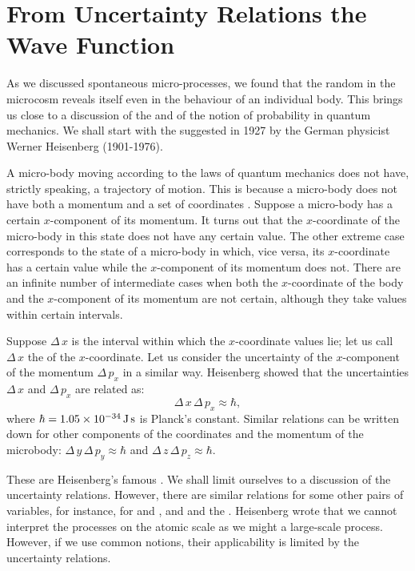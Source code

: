 \section{From Uncertainty Relations the Wave Function}

As we discussed spontaneous micro-processes, we found that the random
in the microcosm reveals itself even in the behaviour of an individual
body. This brings us close to a discussion of the  and
 of the notion of probability in quantum mechanics. We shall start with the  suggested in 1927 by the German physicist Werner Heisenberg (1901-1976).

 A micro-body moving according to the laws of quantum mechanics does not have, strictly speaking, a trajectory of
motion. This is because a micro-body does not have both a momentum
and a set of coordinates . Suppose a micro-body has
a certain $x$-component of its momentum. It turns out that the
$x$-coordinate of the micro-body in this state does not have any certain
value. The other extreme case corresponds to the state of a micro-body
in which, vice versa, its $x$-coordinate has a certain value while the
$x$-component of its momentum does not. There are an infinite number
of intermediate cases when both the $x$-coordinate of the body and the
$x$-component of its momentum are not certain, although they take
values within certain intervals.

Suppose $\Delta \, x$ is the interval within which the $x$-coordinate values lie;
let us call $\Delta \, x$ the  of the $x$-coordinate. Let us consider the uncertainty of the $x$-component of the momentum $\Delta \, p_{x}$ in a similar way. Heisenberg showed that the uncertainties $\Delta \, x$ and $\Delta \, p_{x}$ are related as:
\begin{equation}%
\Delta \, x \, \Delta \, p_{x} \approx \hbar,
\label{eq-5.3}
\end{equation}
where $\hbar = 1.05 \times \SI{d-34}{\joule\second}$ is Planck's constant. Similar relations can be written down for other components of the coordinates and the momentum of the microbody: $\Delta \, y \, \Delta \, p_{y} \approx \hbar$ and $\Delta \, z \, \Delta \, p_{z} \approx \hbar$.

These are Heisenberg's famous . We shall limit
ourselves to a discussion of the  uncertainty
relations. However, there are similar relations for some other pairs of
variables, for instance, for  and , and  and the . Heisenberg wrote that we cannot interpret the processes on the atomic scale as we might a large-scale process. However, if we use common notions, their applicability is limited by the uncertainty relations.

